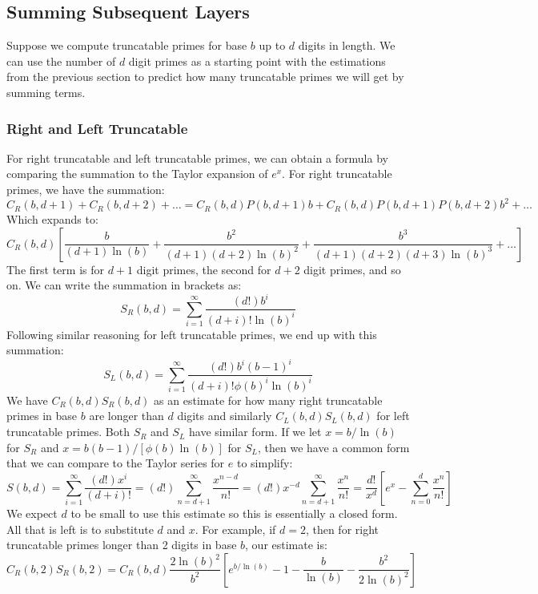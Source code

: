 \documentclass[12pt]{article}
\begin{document}
\subsection{Summing Subsequent Layers}

Suppose we compute truncatable primes for base $b$ up to $d$ digits in length. We can use the number of $d$ digit primes as a starting point with the estimations from the previous section to predict how many truncatable primes we will get by summing terms.

\subsubsection{Right and Left Truncatable}

For right truncatable and left truncatable primes, we can obtain a formula by comparing the summation to the Taylor expansion of $e^x$. For right truncatable primes, we have the summation:
\begin{equation}
C_R(b,d+1) + C_R(b,d+2) + \ldots = C_R(b,d)P(b,d+1)b + C_R(b,d)P(b,d+1)P(b,d+2)b^2 + \ldots
\end{equation}
Which expands to:
\begin{equation}
C_R(b,d) \left[ \frac{b}{(d+1)\ln(b)} + \frac{b^2}{(d+1)(d+2)\ln(b)^2} + \frac{b^3}{(d+1)(d+2)(d+3)\ln(b)^3} + \ldots \right]
\end{equation}
The first term is for $d+1$ digit primes, the second for $d+2$ digit primes, and so on. We can write the summation in brackets as:
\begin{equation}
S_R(b,d) = \sum_{i=1}^\infty \frac{(d!)b^i}{(d+i)!\ln(b)^i}
\end{equation}
Following similar reasoning for left truncatable primes, we end up with this summation:
\begin{equation}
S_L(b,d) = \sum_{i=1}^\infty \frac{(d!)b^i(b-1)^i}{(d+i)!\phi(b)^i\ln(b)^i}
\end{equation}
We have $C_R(b,d)S_R(b,d)$ as an estimate for how many right truncatable primes in base $b$ are longer than $d$ digits and similarly $C_L(b,d)S_L(b,d)$ for left truncatable primes. Both $S_R$ and $S_L$ have similar form. If we let $x=b/\ln(b)$ for $S_R$ and $x=b(b-1)/[\phi(b)\ln(b)]$ for $S_L$, then we have a common form that we can compare to the Taylor series for $e$ to simplify:
\begin{equation}
S(b,d) = \sum_{i=1}^\infty \frac{(d!)x^i}{(d+i)!} = (d!)\sum_{n=d+1}^\infty \frac{x^{n-d}}{n!} = (d!) x^{-d} \sum_{n=d+1}^\infty \frac{x^n}{n!} = \frac{d!}{x^d} \left[ e^x - \sum_{n=0}^d \frac{x^n}{n!} \right]
\end{equation}
We expect $d$ to be small to use this estimate so this is essentially a closed form. All that is left is to substitute $d$ and $x$. For example, if $d=2$, then for right truncatable primes longer than 2 digits in base $b$, our estimate is:
\begin{equation}
C_R(b,2)S_R(b,2) = C_R(b,d) \frac{2\ln(b)^2}{b^2} \left[ e^{b/\ln(b)} - 1 - \frac{b}{\ln(b)} - \frac{b^2}{2\ln(b)^2} \right]
\end{equation}
\end{document}

